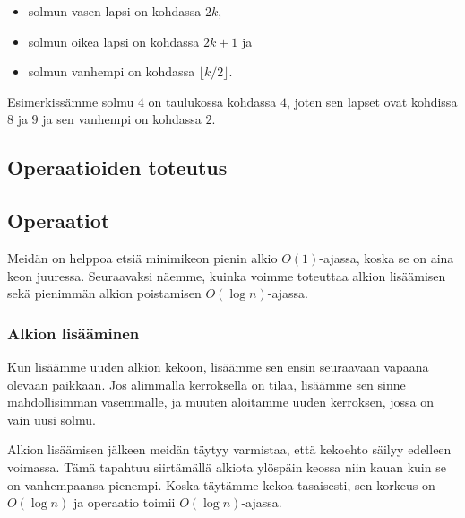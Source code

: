 \begin{itemize}
\item solmun vasen lapsi on kohdassa $2k$,
\item solmun oikea lapsi on kohdassa $2k+1$ ja
\item solmun vanhempi on kohdassa $\lfloor k/2 \rfloor$.
\end{itemize}

Esimerkissämme solmu 4
on taulukossa kohdassa $4$,
joten sen lapset ovat kohdissa $8$ ja $9$
ja sen vanhempi on kohdassa $2$.

\subsection{Operaatioiden toteutus}

\subsection{Operaatiot}

Meidän on helppoa etsiä minimikeon pienin alkio $O(1)$-ajassa,
koska se on aina keon juuressa.
Seuraavaksi näemme, kuinka voimme toteuttaa alkion lisäämisen
sekä pienimmän alkion poistamisen $O(\log n)$-ajassa.

\subsubsection{Alkion lisääminen}

Kun lisäämme uuden alkion kekoon, lisäämme sen ensin seuraavaan
vapaana olevaan paikkaan. Jos alimmalla kerroksella on tilaa,
lisäämme sen sinne mahdollisimman vasemmalle,
ja muuten aloitamme uuden kerroksen, jossa on vain uusi solmu.

Alkion lisäämisen jälkeen meidän täytyy varmistaa,
että kekoehto säilyy edelleen voimassa.
Tämä tapahtuu siirtämällä alkiota ylöspäin keossa
niin kauan kuin se on vanhempaansa pienempi.
Koska täytämme kekoa tasaisesti, sen korkeus on $O(\log n)$
ja operaatio toimii $O(\log n)$-ajassa.

